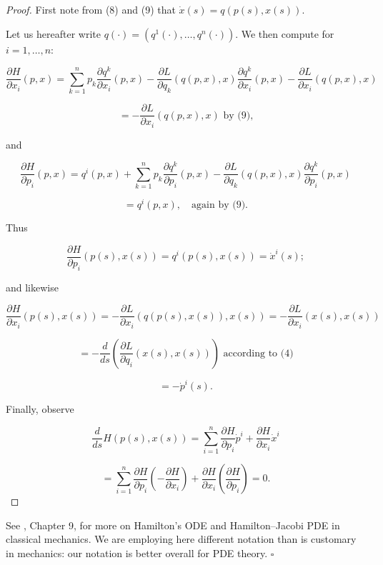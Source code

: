 \begin{proof}
First note from (8) and (9) that $\dot{x}(s) = q(p(s), x(s))$.

Let us hereafter write $q(\cdot) = (q^1(\cdot), \ldots, q^n(\cdot))$. We then compute for $i = 1, \ldots, n$:

$$\frac{\partial H}{\partial x_i}(p, x) = \sum_{k=1}^n p_k \frac{\partial q^k}{\partial x_i}(p, x) - \frac{\partial L}{\partial q_k}(q(p, x), x) \frac{\partial q^k}{\partial x_i}(p, x) - \frac{\partial L}{\partial x_i}(q(p, x), x)$$

$$= -\frac{\partial L}{\partial x_i}(q(p, x), x) \text{ by (9),}$$

and

$$\frac{\partial H}{\partial p_i}(p, x) = q^i(p, x) + \sum_{k=1}^n p_k \frac{\partial q^k}{\partial p_i}(p, x) - \frac{\partial L}{\partial q_k}(q(p, x), x) \frac{\partial q^k}{\partial p_i}(p, x)$$

$$= q^i(p, x), \quad \text{again by (9).}$$

Thus

$$\frac{\partial H}{\partial p_i}(p(s), x(s)) = q^i(p(s), x(s)) = \dot{x}^i(s);$$

and likewise

$$\frac{\partial H}{\partial x_i}(p(s), x(s)) = -\frac{\partial L}{\partial x_i}(q(p(s), x(s)), x(s)) = -\frac{\partial L}{\partial x_i}(x(s), x(s))$$

$$= -\frac{d}{ds}\left(\frac{\partial L}{\partial q_i}(x(s), x(s))\right) \text{ according to (4)}$$

$$= -\dot{p}^i(s).$$

Finally, observe

$$\frac{d}{ds} H(p(s), x(s)) = \sum_{i=1}^n \frac{\partial H}{\partial p_i} \dot{p}^i + \frac{\partial H}{\partial x_i} \dot{x}^i$$

$$= \sum_{i=1}^n \frac{\partial H}{\partial p_i} \left(-\frac{\partial H}{\partial x_i}\right) + \frac{\partial H}{\partial x_i} \left(\frac{\partial H}{\partial p_i}\right) = 0.$$
\end{proof}

\begin{remark}
\label{rem:arnold-mechanics-notation}
See \cite{Arnold1986}, Chapter 9, for more on Hamilton's ODE and Hamilton--Jacobi PDE in classical mechanics. We are employing here different notation than is customary in mechanics: our notation is better overall for PDE theory. $\square$
\end{remark}

